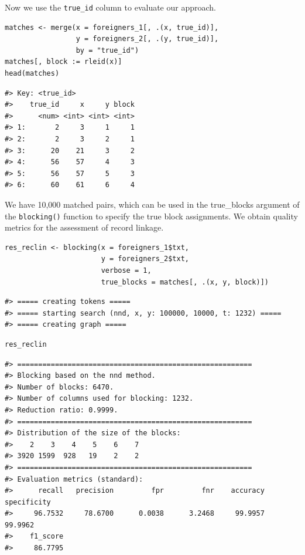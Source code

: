 Now we use the \texttt{true\_id} column to evaluate our approach.

\begin{verbatim}
matches <- merge(x = foreigners_1[, .(x, true_id)],
                 y = foreigners_2[, .(y, true_id)],
                 by = "true_id")
matches[, block := rleid(x)]
head(matches)
\end{verbatim}

\begin{verbatim}
#> Key: <true_id>
#>    true_id     x     y block
#>      <num> <int> <int> <int>
#> 1:       2     3     1     1
#> 2:       2     3     2     1
#> 3:      20    21     3     2
#> 4:      56    57     4     3
#> 5:      56    57     5     3
#> 6:      60    61     6     4
\end{verbatim}

We have 10,000 matched pairs, which can be used in the true\_blocks
argument of the \texttt{blocking()} function to specify the true block
assignments. We obtain quality metrics for the assessment of record
linkage.

\begin{verbatim}
res_reclin <- blocking(x = foreigners_1$txt,
                       y = foreigners_2$txt,
                       verbose = 1,
                       true_blocks = matches[, .(x, y, block)])
\end{verbatim}

\begin{verbatim}
#> ===== creating tokens =====
#> ===== starting search (nnd, x, y: 100000, 10000, t: 1232) =====
#> ===== creating graph =====
\end{verbatim}

\begin{verbatim}
res_reclin
\end{verbatim}

\begin{verbatim}
#> ========================================================
#> Blocking based on the nnd method.
#> Number of blocks: 6470.
#> Number of columns used for blocking: 1232.
#> Reduction ratio: 0.9999.
#> ========================================================
#> Distribution of the size of the blocks:
#>    2    3    4    5    6    7 
#> 3920 1599  928   19    2    2 
#> ========================================================
#> Evaluation metrics (standard):
#>      recall   precision         fpr         fnr    accuracy specificity 
#>     96.7532     78.6700      0.0038      3.2468     99.9957     99.9962 
#>    f1_score 
#>     86.7795
\end{verbatim}

